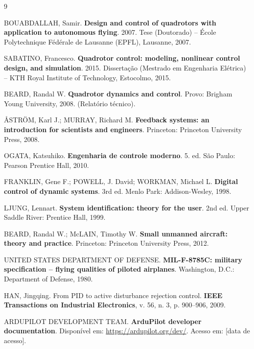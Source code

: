 \documentclass[12pt,a4paper]{article}
\begin{document}
\begin{thebibliography}{9}
\setlength{\itemsep}{0.4em}

BOUABDALLAH, Samir. \textbf{Design and control of quadrotors with application to
autonomous flying}. 2007. Tese (Doutorado) -- École Polytechnique Fédérale de
Lausanne (EPFL), Lausanne, 2007.

SABATINO, Francesco. \textbf{Quadrotor control: modeling, nonlinear control design,
and simulation}. 2015. Dissertação (Mestrado em Engenharia Elétrica) -- KTH Royal
Institute of Technology, Estocolmo, 2015.

BEARD, Randal W. \textbf{Quadrotor dynamics and control}. Provo: Brigham Young
University, 2008. (Relatório técnico).

ÅSTRÖM, Karl J.; MURRAY, Richard M. \textbf{Feedback systems: an introduction for
scientists and engineers}. Princeton: Princeton University Press, 2008.

OGATA, Katsuhiko. \textbf{Engenharia de controle moderno}. 5. ed. São Paulo:
Pearson Prentice Hall, 2010.

FRANKLIN, Gene F.; POWELL, J. David; WORKMAN, Michael L. \textbf{Digital control of
dynamic systems}. 3rd ed. Menlo Park: Addison-Wesley, 1998.

LJUNG, Lennart. \textbf{System identification: theory for the user}. 2nd ed. Upper
Saddle River: Prentice Hall, 1999.

BEARD, Randal W.; McLAIN, Timothy W. \textbf{Small unmanned aircraft: theory and
practice}. Princeton: Princeton University Press, 2012.

UNITED STATES DEPARTMENT OF DEFENSE. \textbf{MIL-F-8785C: military specification --
flying qualities of piloted airplanes}. Washington, D.C.: Department of Defense,
1980.

HAN, Jingqing. From PID to active disturbance rejection control. \textbf{IEEE
Transactions on Industrial Electronics}, v. 56, n. 3, p. 900--906, 2009.

ARDUPILOT DEVELOPMENT TEAM. \textbf{ArduPilot developer documentation}. Disponível
em: \url{https://ardupilot.org/dev/}. Acesso em: [data de acesso].

\end{thebibliography}
\end{document}
